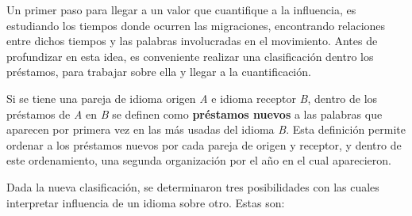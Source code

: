 

Un primer paso para llegar a un valor que cuantifique a la influencia, es
estudiando los tiempos donde ocurren las migraciones, encontrando relaciones
entre dichos tiempos y las palabras involucradas en el movimiento. Antes de
profundizar en esta idea, es conveniente realizar una clasificación dentro los
préstamos,  para trabajar sobre ella y llegar a la cuantificación. 

Si se tiene una pareja de idioma origen \textit{A} e idioma receptor
\textit{B},  dentro de los préstamos de \textit{A} en \textit{B} se definen
como  \textbf{préstamos nuevos} a las  palabras que aparecen por primera vez en
las más usadas del idioma \textit{B}. Esta definición permite ordenar a los
préstamos nuevos por cada pareja de origen y receptor, y dentro  de este
ordenamiento, una segunda organización  por el año en el cual aparecieron. 



Dada la nueva clasificación, se determinaron tres posibilidades con las cuales
interpretar influencia de un idioma sobre otro. Estas son: 

